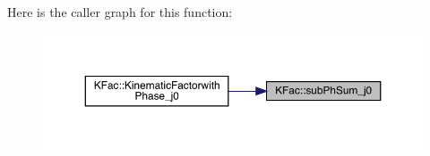 Here is the caller graph for this function\+:
\nopagebreak
\begin{figure}[H]
\begin{center}
\leavevmode
\includegraphics[width=350pt]{d2/d89/namespaceKFac_abb86856b8424632f8f879408ce2cc05b_icgraph}
\end{center}
\end{figure}
